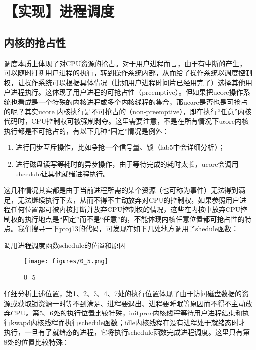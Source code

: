\section{【实现】进程调度}\label{ux5b9eux73b0ux8fdbux7a0bux8c03ux5ea6}

\subsection{内核的抢占性}\label{ux5185ux6838ux7684ux62a2ux5360ux6027}

调度本质上体现了对CPU资源的抢占。对于用户进程而言，由于有中断的产生，可以随时打断用户进程的执行，转到操作系统内部，从而给了操作系统以调度控制权，让操作系统可以根据具体情况（比如用户进程时间片已经用完了）选择其他用户进程执行。这体现了用户进程的可抢占性（preemptive）。但如果把ucore操作系统也看成是一个特殊的内核进程或多个内核线程的集合，那ucore是否也是可抢占的呢？其实ucore
内核执行是不可抢占的（non-preemptive），即在执行``任意''内核代码时，CPU控制权可被强制剥夺。这里需要注意，不是在所有情况下ucore内核执行都是不可抢占的，有以下几种``固定''情况是例外：

\begin{enumerate}
\def\labelenumi{\arabic{enumi}.}
\item
  进行同步互斥操作，比如争抢一个信号量、锁（lab5中会详细分析）；
\item
  进行磁盘读写等耗时的异步操作，由于等待完成的耗时太长，ucore会调用shcedule让其他就绪进程执行。
\end{enumerate}

这几种情况其实都是由于当前进程所需的某个资源（也可称为事件）无法得到满足，无法继续执行下去，从而不得不主动放弃对CPU的控制权。如果参照用户进程任何位置都可被内核打断并放弃CPU控制权的情况，这些在内核中放弃CPU控制权的执行地点是``固定''而不是``任意''的，不能体现内核任意位置都可抢占性的特点。我们搜寻一下proj13的代码，可发现在如下几处地方调用了shedule函数：

调用进程调度函数schedule的位置和原因

\begin{figure}[htbp]
\centering
\texttt{[image: figures/0\_5.png]}
\caption{0\_5}
\end{figure}

仔细分析上述位置，第1、2、3、4、7处的执行位置体现了由于访问磁盘数据的资源或获取锁资源一时等不到满足、进程要退出、进程要睡眠等原因而不得不主动放弃CPU。第5、6处的执行位置比较特殊，initproc内核线程等待用户进程结束和执行kwapd内核线程而执行schedule函数；idle内核线程在没有进程处于就绪态时才执行，一旦有了就绪态的进程，它将执行schedule函数完成进程调度。这里只有第8处的位置比较特殊：

